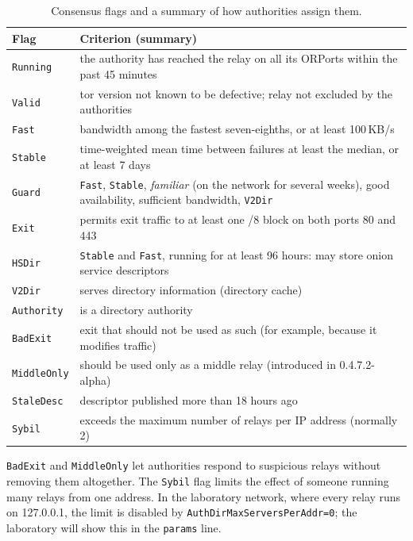 \begin{table}[htbp]
\centering\small
\begin{tabularx}{\textwidth}{@{}l>{\raggedright\arraybackslash}X@{}}
\toprule
Flag & Criterion (summary) \\
\midrule
\texttt{Running} & the authority has reached the relay on all its ORPorts within the past 45 minutes \\
\texttt{Valid} & tor version not known to be defective; relay not excluded by the authorities \\
\texttt{Fast} & bandwidth among the fastest seven-eighths, or at least 100\,KB/s \\
\texttt{Stable} & time-weighted mean time between failures at least the median, or at least 7 days \\
\texttt{Guard} & \texttt{Fast}, \texttt{Stable}, \emph{familiar} (on the network for several weeks), good availability, sufficient bandwidth, \texttt{V2Dir} \\
\texttt{Exit} & permits exit traffic to at least one /8 block on both ports 80 and 443 \\
\texttt{HSDir} & \texttt{Stable} and \texttt{Fast}, running for at least 96 hours: may store onion service descriptors \\
\texttt{V2Dir} & serves directory information (directory cache) \\
\texttt{Authority} & is a directory authority \\
\texttt{BadExit} & exit that should not be used as such (for example, because it modifies traffic) \\
\texttt{MiddleOnly} & should be used only as a middle relay (introduced in 0.4.7.2-alpha) \\
\texttt{StaleDesc} & descriptor published more than 18 hours ago \\
\texttt{Sybil} & exceeds the maximum number of relays per IP address (normally 2) \\
\bottomrule
\end{tabularx}
\caption{Consensus flags and a summary of how authorities assign them.}
\label{tab:flag}
\end{table}

\texttt{BadExit} and \texttt{MiddleOnly} let authorities respond to suspicious relays without removing them altogether. The \texttt{Sybil} flag limits the effect of someone running many relays from one address. In the laboratory network, where every relay runs on 127.0.0.1, the limit is disabled by \texttt{AuthDirMaxServersPerAddr=0}; the laboratory will show this in the \texttt{params} line.

